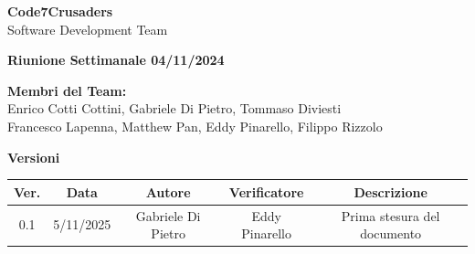 \documentclass{article}
\begin{document}
\begin{titlepage}
    {\Huge \textbf{Code7Crusaders}}\\
    \vspace{0.5cm}
    {\Large Software Development Team}\\
    \vspace{2cm}
    
    {\large \textbf{Riunione Settimanale 04/11/2024}}\\
    \vspace{5cm}

    \textbf{Membri del Team:}\\
    Enrico Cotti Cottini, Gabriele Di Pietro, Tommaso Diviesti \\
    Francesco Lapenna, Matthew Pan, Eddy Pinarello, Filippo Rizzolo \\
    \vspace{0.5cm}
    
    \vspace{1cm}
\end{titlepage}

\newpage
\begin{table}[h!]
\centering
\textbf{Versioni} \\ %
\vspace{2mm} %
\begin{tabular}{|c|c|c|c|c|}
    \hline
    \textbf{Ver.} & \textbf{Data} & \textbf{Autore} & \textbf{Verificatore} & \textbf{Descrizione} \\
    \hline
    0.1 & 5/11/2025 & Gabriele Di Pietro & Eddy Pinarello & Prima stesura del documento \\ 
    \hline
\end{tabular}
\end{table}

\newpage
\tableofcontents

\newpage
\end{document}
